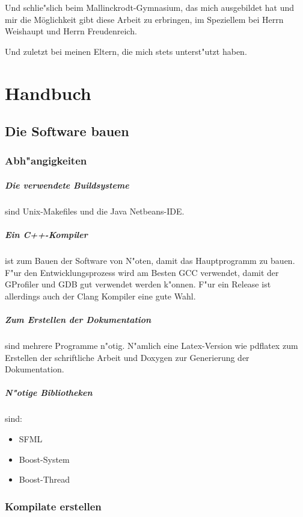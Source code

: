 \documentclass[14pt, a4paper]{report}
\begin{document}
Und schlie"slich beim Mallinckrodt-Gymnasium, das mich ausgebildet hat und mir die Möglichkeit
gibt diese Arbeit zu erbringen, im Speziellem bei Herrn Weishaupt und Herrn
Freudenreich. 

Und zuletzt bei meinen Eltern, die mich stets unterst"utzt haben.
 


\appendix
\chapter{Handbuch}
\tableofcontents
\section{Die Software bauen}

\subsection{Abh"angigkeiten}
\paragraph{Die verwendete Buildsysteme} sind Unix-Makefiles und die Java Netbeans-IDE.  
\paragraph{Ein C++-Kompiler} ist zum Bauen der Software von N"oten, damit das 
Hauptprogramm zu bauen. F"ur den Entwicklungsprozess wird am Besten GCC verwendet, damit
der GProfiler und GDB gut verwendet werden k"onnen. F"ur ein Release ist allerdings auch
der Clang Kompiler eine gute Wahl. 
\paragraph{Zum Erstellen der Dokumentation} sind mehrere Programme n"otig. N"amlich
eine Latex-Version wie pdflatex zum Erstellen der schriftliche Arbeit und Doxygen zur
Generierung der Dokumentation.
\paragraph{N"otige Bibliotheken} sind:
\begin{itemize}
\item SFML
\item Boost-System
\item Boost-Thread
\end{itemize}

\subsection{Kompilate erstellen}
\end{document}

